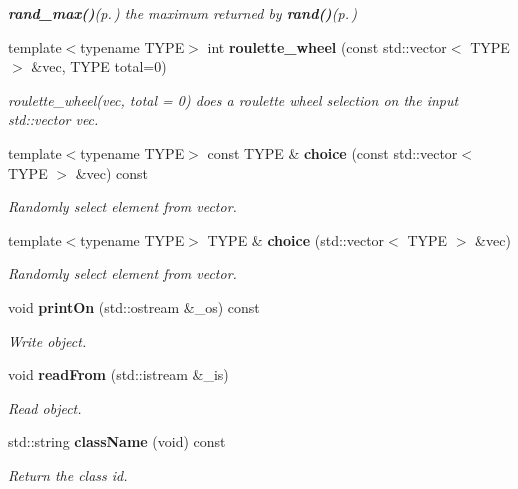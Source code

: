 \begin{CompactItemize}
\begin{CompactList}\small\item\em {\bf rand\_\-max()}{\rm (p.\,\pageref{classeo_rng_a12})} the maximum returned by {\bf rand()}{\rm (p.\,\pageref{classeo_rng_a11})} \item\end{CompactList}\item 
template$<$typename TYPE$>$ int {\bf roulette\_\-wheel} (const std::vector$<$ TYPE $>$ \&vec, TYPE total=0)
\begin{CompactList}\small\item\em roulette\_\-wheel(vec, total = 0) does a roulette wheel selection on the input std::vector vec. \item\end{CompactList}\item 
template$<$typename TYPE$>$ const TYPE \& {\bf choice} (const std::vector$<$ TYPE $>$ \&vec) const 
\begin{CompactList}\small\item\em Randomly select element from vector. \item\end{CompactList}\item 
template$<$typename TYPE$>$ TYPE \& {\bf choice} (std::vector$<$ TYPE $>$ \&vec)
\begin{CompactList}\small\item\em Randomly select element from vector. \item\end{CompactList}\item 
void {\bf print\-On} (std::ostream \&\_\-os) const 
\begin{CompactList}\small\item\em Write object. \item\end{CompactList}\item 
void {\bf read\-From} (std::istream \&\_\-is)
\begin{CompactList}\small\item\em Read object. \item\end{CompactList}\item 
std::string {\bf class\-Name} (void) const 
\begin{CompactList}\small\item\em Return the class id. \item\end{CompactList}\end{CompactItemize}
